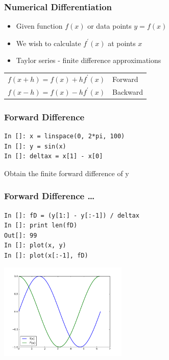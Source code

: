 \documentclass[14pt,compress]{beamer}
\begin{document}
\begin{frame}[fragile]
\frametitle{Numerical Differentiation}
\begin{itemize}
\item Given function $f(x)$ or data points $y=f(x)$
\item We wish to calculate $f^{'}(x)$ at points $x$
\item Taylor series - finite difference approximations
\end{itemize}
\begin{center}
\begin{tabular}{l l}
$f(x+h)=f(x)+hf^{'}(x)$ &Forward \\
$f(x-h)=f(x)-hf^{'}(x)$ &Backward
\end{tabular}
\end{center}
\end{frame}

\begin{frame}[fragile]
\frametitle{Forward Difference}
\begin{lstlisting}
In []: x = linspace(0, 2*pi, 100)
In []: y = sin(x)
In []: deltax = x[1] - x[0]
\end{lstlisting}
Obtain the finite forward difference of y
\end{frame}

\begin{frame}[fragile]
\frametitle{Forward Difference \ldots}
\begin{lstlisting}
In []: fD = (y[1:] - y[:-1]) / deltax
In []: print len(fD)
Out[]: 99
In []: plot(x, y) 
In []: plot(x[:-1], fD)
\end{lstlisting}
\vspace{-.2in}
\begin{center}
  \includegraphics[height=1.8in, interpolate=true]{data/fwdDiff}
\end{center}
\end{frame}
\end{document}
